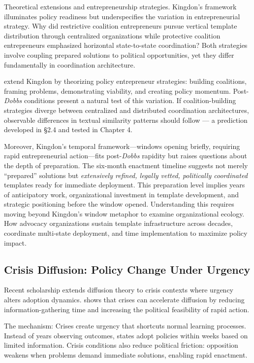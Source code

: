 Theoretical extensions and entrepreneurship strategies. Kingdon's framework illuminates policy readiness but underspecifies the variation in entrepreneurial strategy. Why did restrictive coalition entrepreneurs pursue vertical template distribution through centralized organizations while protective coalition entrepreneurs emphasized horizontal state-to-state coordination? Both strategies involve coupling prepared solutions to political opportunities, yet they differ fundamentally in coordination architecture.

\textcite{mintromPolicyEntrepreneurshipPolicy2009} extend Kingdon by theorizing policy entrepreneur strategies: building coalitions, framing problems, demonstrating viability, and creating policy momentum. Post-\emph{Dobbs} conditions present a natural test of this variation. If coalition-building strategies diverge between centralized and distributed coordination architectures, observable differences in textual similarity patterns should follow — a prediction developed in §2.4 and tested in Chapter 4.

Moreover, Kingdon's temporal framework---windows opening briefly, requiring rapid entrepreneurial action---fits post-\emph{Dobbs} rapidity but raises questions about the depth of preparation. The six-month enactment timeline suggests not merely ``prepared'' solutions but \emph{extensively refined, legally vetted, politically coordinated} templates ready for immediate deployment. This preparation level implies years of anticipatory work, organizational investment in template development, and strategic positioning before the window opened. Understanding this requires moving beyond Kingdon's window metaphor to examine organizational ecology. How advocacy organizations sustain template infrastructure across decades, coordinate multi-state deployment, and time implementation to maximize policy impact.

\subsection{Crisis Diffusion: Policy Change Under Urgency}

Recent scholarship extends diffusion theory to crisis contexts where urgency alters adoption dynamics. \textcite{bousheyPolicyDiffusionDynamics2010a} shows that crises can accelerate diffusion by reducing information-gathering time and increasing the political feasibility of rapid action.

The mechanism: Crises create urgency that shortcuts normal learning processes. Instead of years observing outcomes, states adopt policies within weeks based on limited information. Crisis conditions also reduce political friction: opposition weakens when problems demand immediate solutions, enabling rapid enactment.

